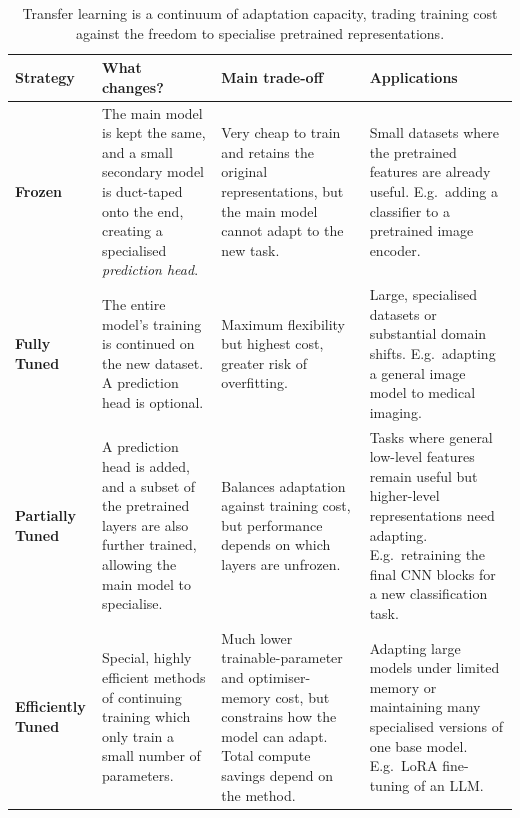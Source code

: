 \begin{table}[htbp]
    \centering
    \small
    \begin{tabularx}{\linewidth}{@{}L{.19\linewidth}YYY@{}}
    \toprule
    Strategy & What changes? & Main trade-off & Applications \\
    \midrule

    \textbf{Frozen}
    &
    The main model is kept the same, and a small secondary model is duct-taped onto the end, creating a specialised \textit{prediction head}.
    &
    Very cheap to train and retains the original representations, but the main model cannot adapt to the new task.
    &
    Small datasets where the pretrained features are already useful. E.g.\ adding a classifier to a pretrained image encoder.
    \\

    \addlinespace
    \textbf{Fully Tuned}
    &
    The entire model's training is continued on the new dataset. A prediction head is optional.
    &
    Maximum flexibility but highest cost, greater risk of overfitting.
    &
    Large, specialised datasets or substantial domain shifts. E.g.\ adapting a general image model to medical imaging.
    \\

    \addlinespace
    \textbf{Partially Tuned}
    &
    A prediction head is added, and a subset of the pretrained layers are also further trained, allowing the main model to specialise.
    &
    Balances adaptation against training cost, but performance depends on which layers are unfrozen.
    &
    Tasks where general low-level features remain useful but higher-level representations need adapting. E.g.\ retraining the final CNN blocks for a new classification task.
    \\

    \addlinespace
    \textbf{Efficiently Tuned}
    &
    Special, highly efficient methods of continuing training which only train a small number of parameters.
    &
    Much lower trainable-parameter and optimiser-memory cost, but constrains how the model can adapt. Total compute savings depend on the method.
    &
    Adapting large models under limited memory or maintaining many specialised versions of one base model. E.g.\ LoRA fine-tuning of an LLM.
    \\

    \bottomrule
    \end{tabularx}
    \caption{Transfer learning is a continuum of adaptation capacity, trading training cost against the freedom to specialise pretrained representations.}
\end{table}


